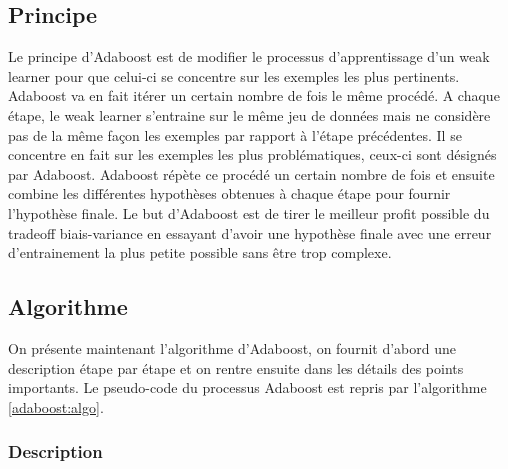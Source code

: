 \documentclass[12pt]{article}
\begin{document}
	\subsection{Principe}
	
	Le principe d'Adaboost est de modifier le processus d'apprentissage d'un weak learner pour que celui-ci se concentre sur les exemples les plus pertinents. Adaboost va en fait itérer un certain nombre de fois le même procédé. A chaque étape, le weak learner s'entraine sur le même jeu de données mais ne considère pas de la même façon les exemples par rapport à l'étape précédentes. Il se concentre en fait sur les exemples les plus problématiques, ceux-ci sont désignés par Adaboost. Adaboost répète ce procédé un certain nombre de fois et ensuite combine les différentes hypothèses obtenues à chaque étape pour fournir l'hypothèse finale. Le but d'Adaboost est de tirer le meilleur profit possible du tradeoff biais-variance en essayant d'avoir une hypothèse finale avec une erreur d'entrainement la plus petite possible sans être trop complexe.
	
	\subsection{Algorithme}
	
	On présente maintenant l'algorithme d'Adaboost, on fournit d'abord une description étape par étape et on rentre ensuite dans les détails des points importants. Le pseudo-code du processus Adaboost est repris par l'algorithme \ref{adaboost:algo}.
	
	\subsubsection{Description}
	
\end{document}
